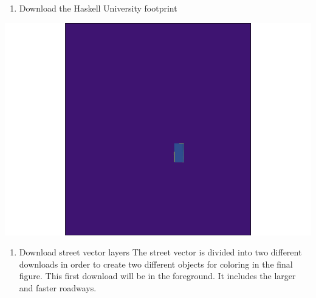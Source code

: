 \documentclass[
  paper=a4,
  ,captions=tableheading
]{scrartcl}
\newenvironment{Shaded}{\begin{snugshade}}{\end{snugshade}}
\newcommand{\AttributeTok}[1]{\textcolor[rgb]{0.77,0.63,0.00}{#1}}
\newcommand{\DecValTok}[1]{\textcolor[rgb]{0.00,0.00,0.81}{#1}}
\newcommand{\FunctionTok}[1]{\textcolor[rgb]{0.00,0.00,0.00}{#1}}
\newcommand{\NormalTok}[1]{#1}
\newcommand{\OtherTok}[1]{\textcolor[rgb]{0.56,0.35,0.01}{#1}}
\newcommand{\SpecialCharTok}[1]{\textcolor[rgb]{0.00,0.00,0.00}{#1}}
\newcommand{\StringTok}[1]{\textcolor[rgb]{0.31,0.60,0.02}{#1}}
\providecommand{\tightlist}{%
  \setlength{\itemsep}{0pt}\setlength{\parskip}{0pt}}
\begin{document}
\begin{enumerate}
\def\labelenumi{\arabic{enumi}.}
\tightlist
\item
  Download the Haskell University footprint
\end{enumerate}

\begin{Shaded}
\end{Shaded}

\includegraphics{Haskell_files/figure-latex/unnamed-chunk-13-1.pdf}

\begin{enumerate}
\def\labelenumi{\arabic{enumi}.}
\setcounter{enumi}{1}
\tightlist
\item
  Download street vector layers The street vector is divided into two
  different downloads in order to create two different objects for
  coloring in the final figure. This first download will be in the
  foreground. It includes the larger and faster roadways.
\end{enumerate}
\end{document}
